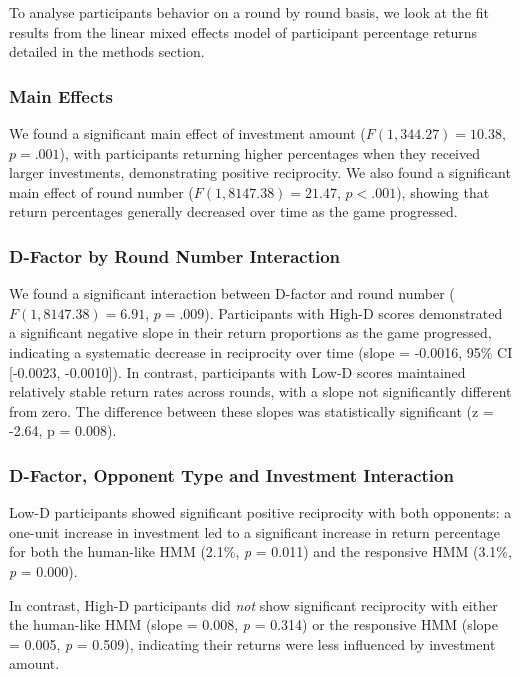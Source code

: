 \documentclass[
]{article}
\begin{document}
To analyse participants behavior on a round by round basis, we look at the fit results from the linear mixed effects model of participant percentage returns detailed in the methods section.

\subsubsection{Main Effects}\label{main-effects}

We found a significant main effect of investment amount (\(F(1, 344.27) = 10.38\), \(p = .001\)), with participants returning higher percentages when they received larger investments, demonstrating positive reciprocity. We also found a significant main effect of round number (\(F(1, 8147.38) = 21.47\), \(p < .001\)), showing that return percentages generally decreased over time as the game progressed.

\subsubsection{D-Factor by Round Number Interaction}\label{d-factor-by-round-number-interaction}

We found a significant interaction between D-factor and round number (\(F(1, 8147.38) = 6.91\), \(p = .009\)). Participants with High-D scores demonstrated a significant negative slope in their return proportions as the game progressed, indicating a systematic decrease in reciprocity over time (slope = -0.0016, 95\% CI {[}-0.0023, -0.0010{]}). In contrast, participants with Low-D scores maintained relatively stable return rates across rounds, with a slope not significantly different from zero. The difference between these slopes was statistically significant (z = -2.64, p = 0.008).

\subsubsection{D-Factor, Opponent Type and Investment Interaction}\label{d-factor-opponent-type-and-investment-interaction}

Low-D participants showed significant positive reciprocity with both opponents: a one-unit increase in investment led to a significant increase in return percentage for both the human-like HMM (2.1\%, \emph{p} = 0.011) and the responsive HMM (3.1\%, \emph{p} = 0.000).

In contrast, High-D participants did \emph{not} show significant reciprocity with either the human-like HMM (slope = 0.008, \emph{p} = 0.314) or the responsive HMM (slope = 0.005, \emph{p} = 0.509), indicating their returns were less influenced by investment amount.
\end{document}
